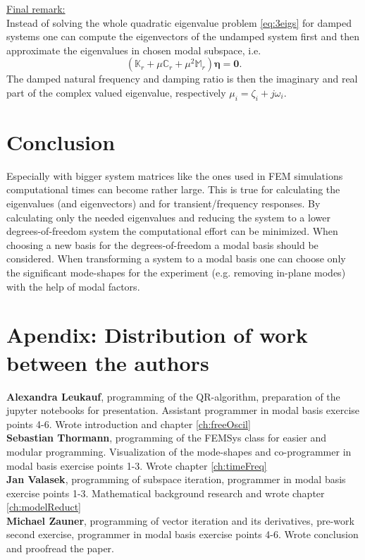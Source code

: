 \documentclass[conference]{journal}
\newcommand{\bb}[1]{\mathbb{#1}}
\newcommand{\B}[1]{\mathbf{#1}}
\newcommand{\Beta}{\boldsymbol{\eta}}
\newcommand{\M}{\bb{M}}
\newcommand{\C}{\bb{C}}
\newcommand{\K}{\bb{K}}
\begin{document}
	\underline{Final remark:}\\ Instead of solving the whole quadratic eigenvalue problem \eqref{eq:3eigs} for damped systems one can compute the eigenvectors of the undamped system first and then approximate the eigenvalues in chosen modal subspace, i.e.
	\begin{equation}
	(\K_r + \mu \C_r + \mu^2 \M_r) \Beta = \B{0}.
	\end{equation}  
	The damped natural frequency and damping ratio is then the imaginary and real part of the complex valued eigenvalue, respectively $\mu_i = \zeta_i + j \omega_i$.
	\section{Conclusion}
	Especially with bigger system matrices like the ones used in FEM simulations computational times can become rather large. This is true for calculating the eigenvalues (and eigenvectors) and for transient/frequency responses. By calculating only the needed eigenvalues and reducing the system to a lower degrees-of-freedom system the computational effort can be minimized. When choosing a new basis for the degrees-of-freedom a modal basis should be considered. When transforming a system to a modal basis one can choose only the significant mode-shapes for the experiment (e.g. removing in-plane modes) with the help of modal factors.\\
	\section{Apendix: Distribution of work between the authors}
	\textbf{Alexandra Leukauf}, programming of the  QR-algorithm, preparation of the jupyter notebooks for presentation. Assistant programmer in modal basis exercise points 4-6. Wrote introduction and chapter \ref{ch:freeOscil} \\
	\textbf{Sebastian Thormann}, programming of the FEMSys class for easier and modular programming. Visualization of the mode-shapes and co-programmer in modal basis exercise points 1-3. Wrote chapter \ref{ch:timeFreq}\\
	\textbf{Jan Valasek}, programming of subspace iteration, programmer in modal basis exercise points 1-3. Mathematical background research and wrote chapter \ref{ch:modelReduct} \\
	\textbf{Michael Zauner}, programming of vector iteration and its derivatives, pre-work second exercise, programmer in modal basis exercise points 4-6. Wrote conclusion and proofread the paper. \\
	
	
\end{document}
